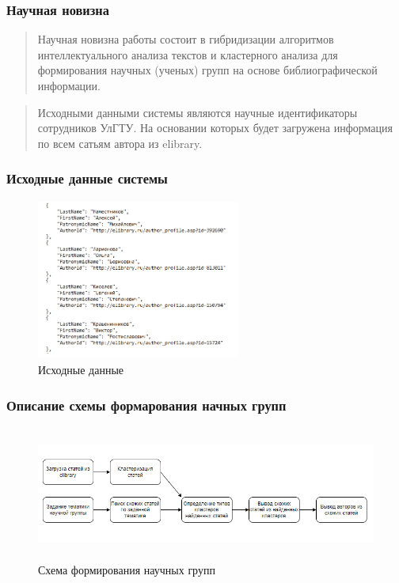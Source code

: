 \documentclass[9pt, compress]{beamer}
\begin{document}
	\begin{frame}
		\frametitle{Научная новизна}
		\begin{quotation}
			Научная новизна работы состоит в гибридизации алгоритмов интеллектуального анализа текстов и кластерного анализа для формирования научных (ученых) групп  на основе библиографической информации.
		\end{quotation}
	\end{frame}

	\begin{frame} 
	    \begin{quotation}
			Исходными данными системы являются научные идентификаторы сотрудников УлГТУ. На основании которых будет загружена информация по всем сатьям автора из elibrary.
		\end{quotation}
		\frametitle{Исходные данные системы}
		\begin{figure}
        \includegraphics[width=190pt,height=150pt]{img/inputdata.png}
        \caption{Исходные данные}
		\end{figure}
	\end{frame}
	
	\begin{frame} 
		\frametitle{Описание схемы формарования начных групп}
		\begin{figure}
        \includegraphics[width=\textwidth,height=125pt]{img/alg.png}
        \caption{Схема формирования научных групп}
		\end{figure}
	\end{frame}
	
\end{document}
